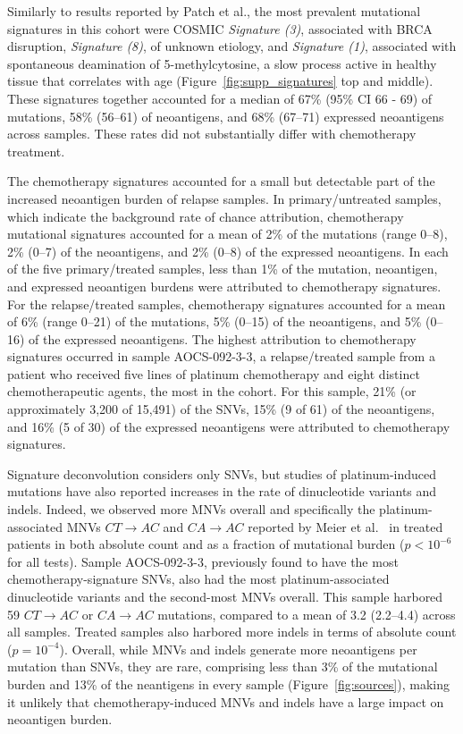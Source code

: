 Similarly to results reported by Patch et al., the most prevalent mutational signatures in this cohort were COSMIC \textit{Signature (3)}, associated with BRCA disruption, \textit{Signature (8)}, of unknown etiology, and \textit{Signature (1)}, associated with spontaneous deamination of 5-methylcytosine, a slow process active in healthy tissue that correlates with age (Figure~\ref{fig:supp_signatures} top and middle). These signatures together accounted for a median of 67\% (95\% CI 66 - 69) of mutations, 58\% (56--61) of neoantigens, and 68\% (67--71) expressed neoantigens across samples. These rates did not substantially differ with chemotherapy treatment.

The chemotherapy signatures accounted for a small but detectable part of the increased neoantigen burden of relapse samples. In primary/untreated samples, which indicate the background rate of chance attribution, chemotherapy mutational signatures accounted for a mean of 2\% of the mutations (range 0--8), 2\% (0--7) of the neoantigens, and 2\% (0--8) of the expressed neoantigens. In each of the five primary/treated samples, less than 1\% of the mutation, neoantigen, and expressed neoantigen burdens were attributed to chemotherapy signatures. For the relapse/treated samples, chemotherapy signatures accounted for a mean of 6\% (range 0--21) of the mutations, 5\% (0--15) of the neoantigens, and 5\% (0--16) of the expressed neoantigens. The highest attribution to chemotherapy signatures occurred in sample AOCS-092-3-3, a relapse/treated sample from a patient who received five lines of platinum chemotherapy and eight distinct chemotherapeutic agents, the most in the cohort. For this sample, 21\% (or approximately 3,200 of 15,491) of the SNVs, 15\% (9 of 61) of the neoantigens, and 16\% (5 of 30) of the expressed neoantigens were attributed to chemotherapy signatures.

Signature deconvolution considers only SNVs, but studies of platinum-induced mutations have also reported increases in the rate of dinucleotide variants and indels. Indeed, we observed more MNVs overall and specifically the platinum-associated MNVs $CT \rightarrow AC$ and $CA \rightarrow AC$ reported by Meier et al.~\cite{Meier_2014} in treated patients in both absolute count and as a fraction of mutational burden ($p < 10^{-6}$ for all tests). Sample AOCS-092-3-3, previously found to have the most chemotherapy-signature SNVs, also had the most platinum-associated dinucleotide variants and the second-most MNVs overall. This sample harbored 59 $CT \rightarrow AC$ or $CA \rightarrow AC$ mutations, compared to a mean of 3.2 (2.2--4.4) across all samples. Treated samples also harbored more indels in terms of absolute count ($p=10^{-4}$). Overall, while MNVs and indels generate more neoantigens per mutation than SNVs, they are rare, comprising less than 3\% of the mutational burden and 13\% of the neantigens in every sample (Figure~\ref{fig:sources}), making it unlikely that chemotherapy-induced MNVs and indels have a large impact on neoantigen burden.

